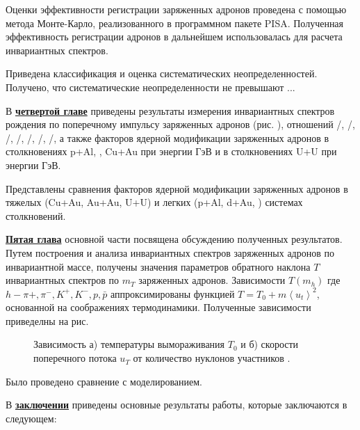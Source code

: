 Оценки эффективности регистрации заряженных адронов проведена с помощью метода Монте-Карло, реализованного в программном пакете PISA. Полученная эффективность регистрации адронов в дальнейшем использовалась для расчета инвариантных спектров. 

Приведена классификация и оценка систематических неопределенностей. Получено, что систематические неопределенности не превышают ...

\begin{comment}
Формулы в строку без номера добавляются так:
\[
    \lambda_{T_s} = K_x\frac{d{x}}{d{T_s}}, \qquad
    \lambda_{q_s} = K_x\frac{d{x}}{d{q_s}},
\]
\end{comment}

В \underline{\textbf{четвертой главе}} приведены результаты измерения инвариантных спектров рождения по поперечному импульсу заряженных адронов (рис. ), отношений \pim/\pip, \Km/\Kp, \prot/\aprot, \prot/\pip, \aprot/\pim, \Kp/\pip, \Km/\pim, а также факторов ядерной модификации заряженных адронов в столкновениях  p+Al, \heau, Cu+Au при энергии  ГэВ и в столкновениях U+U при энергии  ГэВ.

Представлены сравнения факторов ядерной модификации заряженных адронов в тяжелых (Cu+Au, Au+Au, U+U) и легких (p+Al, d+Au, \heau) системах столкновений.

\underline{\textbf{Пятая глава}} основной части посвящена обсуждению полученных результатов. 
Путем построения и анализа инвариантных спектров заряженных адронов по инвариантной массе, получены значения параметров обратного наклона $T$ инвариантных спектров по $m_T$ заряженных адронов. Зависимости $T(m_h)$ где $h - \pi+, \pi^-, K^+, K^-, p, \bar{p}$ аппроксимированы функцией $T = T_0 + m\left< u_t\right>^2$, основанной на соображениях термодинамики.
Полученные зависимости приведелны на рис.



\begin{figure}[ht]
	\caption{Зависимость а) температуры вымораживания $T_0$ и  б) скорости поперечного потока $u_T$ от количество нуклонов участников \Npart.}\label{fig:latex}
\end{figure}

Было проведено сравнение с моделированием.


\FloatBarrier
{}                                  %
В \underline{\textbf{заключении}} приведены основные результаты работы, которые заключаются в следующем:


